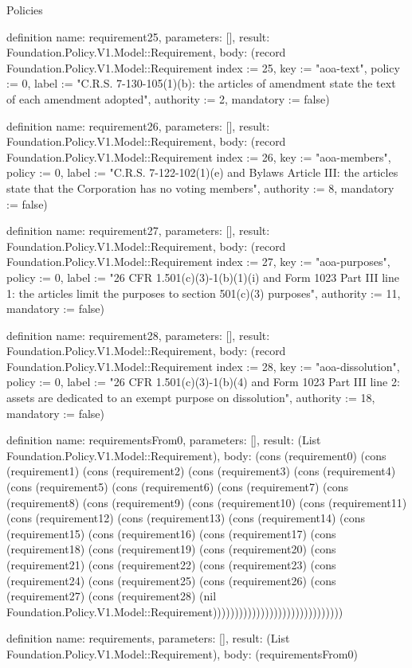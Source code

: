 \begin{lexlean}{Policies}
\begin{semanticmodule}
definition{
  name: requirement25,
  parameters: [],
  result: Foundation.Policy.V1.Model::Requirement,
  body: (record Foundation.Policy.V1.Model::Requirement {index := 25, key := "aoa-text", policy := 0, label := "C.R.S. 7-130-105(1)(b): the articles of amendment state the text of each amendment adopted", authority := 2, mandatory := false})
}

definition{
  name: requirement26,
  parameters: [],
  result: Foundation.Policy.V1.Model::Requirement,
  body: (record Foundation.Policy.V1.Model::Requirement {index := 26, key := "aoa-members", policy := 0, label := "C.R.S. 7-122-102(1)(e) and Bylaws Article III: the articles state that the Corporation has no voting members", authority := 8, mandatory := false})
}

definition{
  name: requirement27,
  parameters: [],
  result: Foundation.Policy.V1.Model::Requirement,
  body: (record Foundation.Policy.V1.Model::Requirement {index := 27, key := "aoa-purposes", policy := 0, label := "26 CFR 1.501(c)(3)-1(b)(1)(i) and Form 1023 Part III line 1: the articles limit the purposes to section 501(c)(3) purposes", authority := 11, mandatory := false})
}

definition{
  name: requirement28,
  parameters: [],
  result: Foundation.Policy.V1.Model::Requirement,
  body: (record Foundation.Policy.V1.Model::Requirement {index := 28, key := "aoa-dissolution", policy := 0, label := "26 CFR 1.501(c)(3)-1(b)(4) and Form 1023 Part III line 2: assets are dedicated to an exempt purpose on dissolution", authority := 18, mandatory := false})
}

definition{
  name: requirementsFrom0,
  parameters: [],
  result: (List Foundation.Policy.V1.Model::Requirement),
  body: (cons (requirement0) (cons (requirement1) (cons (requirement2) (cons (requirement3) (cons (requirement4) (cons (requirement5) (cons (requirement6) (cons (requirement7) (cons (requirement8) (cons (requirement9) (cons (requirement10) (cons (requirement11) (cons (requirement12) (cons (requirement13) (cons (requirement14) (cons (requirement15) (cons (requirement16) (cons (requirement17) (cons (requirement18) (cons (requirement19) (cons (requirement20) (cons (requirement21) (cons (requirement22) (cons (requirement23) (cons (requirement24) (cons (requirement25) (cons (requirement26) (cons (requirement27) (cons (requirement28) (nil Foundation.Policy.V1.Model::Requirement))))))))))))))))))))))))))))))
}

definition{
  name: requirements,
  parameters: [],
  result: (List Foundation.Policy.V1.Model::Requirement),
  body: (requirementsFrom0)
}


\end{semanticmodule}
\end{lexlean}
